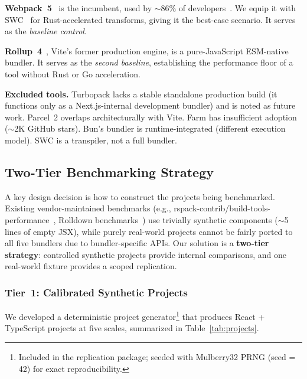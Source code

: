 \documentclass[preprint,12pt]{elsarticle}
\begin{document}
\textbf{Webpack~5}~\cite{webpack2026} is the incumbent, used by $\sim$86\% of developers~\cite{stateofjs2025}. We equip it with SWC~\cite{swc2026} for Rust-accelerated transforms, giving it the best-case scenario. It serves as the \emph{baseline control}.

\textbf{Rollup~4}~\cite{rollup2026}, Vite's former production engine, is a pure-JavaScript ESM-native bundler. It serves as the \emph{second baseline}, establishing the performance floor of a tool without Rust or Go acceleration.

\medskip\noindent\textbf{Excluded tools.} Turbopack lacks a stable standalone production build (it functions only as a Next.js-internal development bundler) and is noted as future work. Parcel~2 overlaps architecturally with Vite. Farm has insufficient adoption ($\sim$2K GitHub stars). Bun's bundler is runtime-integrated (different execution model). SWC is a transpiler, not a full bundler.

\subsection{Two-Tier Benchmarking Strategy}\label{sec:twotier}

A key design decision is how to construct the projects being benchmarked.
Existing vendor-maintained benchmarks (e.g., rspack-contrib/build-tools-performance~\cite{rspackbench2026}, Rolldown benchmarks~\cite{rolldownbench2026}) use trivially synthetic components ($\sim$5 lines of empty JSX), while purely real-world projects cannot be fairly ported to all five bundlers due to bundler-specific APIs.
Our solution is a \textbf{two-tier strategy}: controlled synthetic projects provide internal comparisons, and one real-world fixture provides a scoped replication.

\subsubsection{Tier~1: Calibrated Synthetic Projects}\label{sec:tier1}

We developed a deterministic project generator\footnote{Included in the replication package; seeded with Mulberry32 PRNG (seed = 42) for exact reproducibility.} that produces React + TypeScript projects at five scales, summarized in Table~\ref{tab:projects}.
\end{document}
